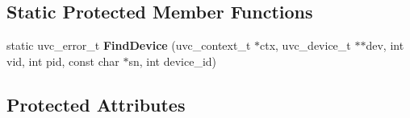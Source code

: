 \subsection*{Static Protected Member Functions}
\begin{DoxyCompactItemize}
\item 
static uvc\+\_\+error\+\_\+t {\bfseries Find\+Device} (uvc\+\_\+context\+\_\+t $\ast$ctx, uvc\+\_\+device\+\_\+t $\ast$$\ast$dev, int vid, int pid, const char $\ast$sn, int device\+\_\+id)\hypertarget{classpangolin_1_1_uvc_video_a7d2cdee6430d09054de1bce4154a8890}{}\label{classpangolin_1_1_uvc_video_a7d2cdee6430d09054de1bce4154a8890}

\end{DoxyCompactItemize}
\subsection*{Protected Attributes}
